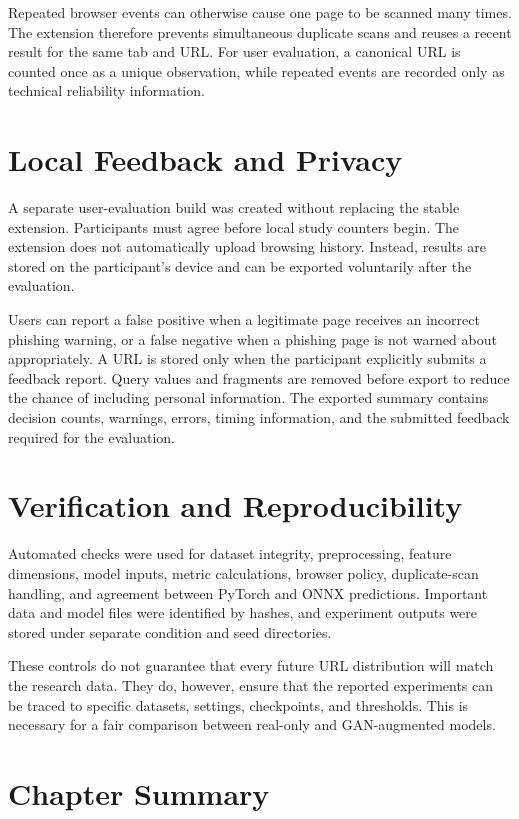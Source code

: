 Repeated browser events can otherwise cause one page to be scanned many times.
The extension therefore prevents simultaneous duplicate scans and reuses a
recent result for the same tab and URL. For user evaluation, a canonical URL is
counted once as a unique observation, while repeated events are recorded only
as technical reliability information.

\section{Local Feedback and Privacy}

A separate user-evaluation build was created without replacing the stable
extension. Participants must agree before local study counters begin. The
extension does not automatically upload browsing history. Instead, results are
stored on the participant's device and can be exported voluntarily after the
evaluation.

Users can report a false positive when a legitimate page receives an incorrect
phishing warning, or a false negative when a phishing page is not warned about
appropriately. A URL is stored only when the participant explicitly submits a
feedback report. Query values and fragments are removed before export to reduce
the chance of including personal information. The exported summary contains
decision counts, warnings, errors, timing information, and the submitted
feedback required for the evaluation.

\section{Verification and Reproducibility}

Automated checks were used for dataset integrity, preprocessing, feature
dimensions, model inputs, metric calculations, browser policy, duplicate-scan
handling, and agreement between PyTorch and ONNX predictions. Important data
and model files were identified by hashes, and experiment outputs were stored
under separate condition and seed directories.

These controls do not guarantee that every future URL distribution will match
the research data. They do, however, ensure that the reported experiments can
be traced to specific datasets, settings, checkpoints, and thresholds. This is
necessary for a fair comparison between real-only and GAN-augmented models.

\section{Chapter Summary}

